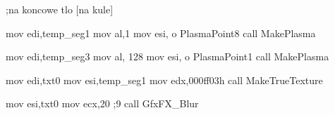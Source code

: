 ;na koncowe tlo [na kule]

	mov   edi,temp_seg1
	mov   al,1
	mov   esi, o PlasmaPoint8
	call  MakePlasma

	mov   edi,temp_seg3
	mov   al, 128
	mov   esi, o PlasmaPoint1
	call  MakePlasma


	mov   edi,txt0
	mov   esi,temp_seg1
	mov   edx,000ff03h
	call  MakeTrueTexture

	mov   esi,txt0
	mov   ecx,20 ;9
	call  GfxFX_Blur
